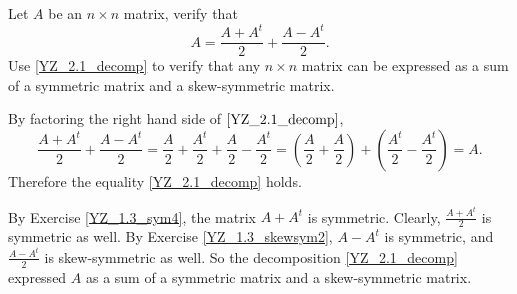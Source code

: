 \documentclass{ximera}
\begin{document}
\begin{exercise} \label{YZ_1.3_decomp1}
Let $A$ be an $n\times n$ matrix, verify that 
\begin{equation} 
 A = \frac{A+A^t}{2}+\frac{A-A^t}{2}.\label{YZ_2.1_decomp} 
\end{equation}
Use \eqref{YZ_2.1_decomp} to verify that any $n\times n$ matrix can be expressed as a sum of a symmetric matrix and a skew-symmetric matrix.

\begin{solution}
\soln
By factoring the right hand side of $\eqref{YZ_2.1_decomp}$,
\[ 
\frac{A+A^t}{2}+\frac{A-A^t}{2}=\frac{A}{2}+\frac{A^t}{2}+\frac{A}{2}-\frac{A^t}{2}=(\frac{A}{2}+\frac{A}{2})+(\frac{A^t}{2}-\frac{A^t}{2})=A.
\]
 Therefore the equality \eqref{YZ_2.1_decomp} holds.
 
By Exercise \ref{YZ_1.3_sym4}, the matrix $A+A^t$ is symmetric. Clearly, $\frac{A+A^t}{2}$ is symmetric as well. By Exercise \ref{YZ_1.3_skewsym2}, $A-A^t$ is symmetric, and $\frac{A-A^t}{2}$ is skew-symmetric as well. So the decomposition \eqref{YZ_2.1_decomp} expressed $A$ as a sum of a symmetric matrix and a skew-symmetric matrix.
\end{solution}
\end{exercise}
\end{document}
